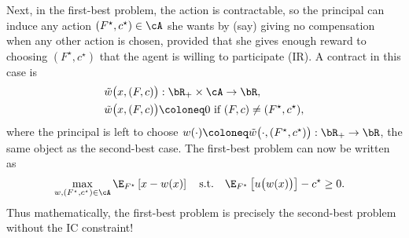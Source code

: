 Next, in the first-best problem, the action is contractable, so the principal can induce any action \((F^\star, c^\star) \in \cA\) she wants by (say) giving no compensation when any other action is chosen, provided that she gives enough reward to choosing \((F^\star, c^\star)\) that the agent is willing to participate (IR).
A contract in this case is
\begin{align*}
  \tilde{w}\big(x, (F, c)\big)&: \bR_+ \times \cA \to \bR, \\
  \tilde{w}\big(x, (F, c)\big) &\coloneq 0 \text{ if } (F, c) \neq (F^\star, c^\star),
\end{align*}
where the principal is left to choose \(w(\cdot) \coloneq \tilde{w}\big(\cdot, (F^\star, c^\star)\big): \bR_+ \to \bR\), the same object as the second-best case.
The first-best problem can now be written as
\begin{align*}
  &\max_{w, (F^\star, c^\star) \in \cA} \E_{F^\star}\left[x - w(x)\right]
  \quad \text{s.t.} \quad \E_{F^\star}\left[u\big(w(x)\big)\right] - c^\star \geq 0.
\end{align*}
Thus mathematically, the first-best problem is precisely the second-best problem without the IC constraint!


